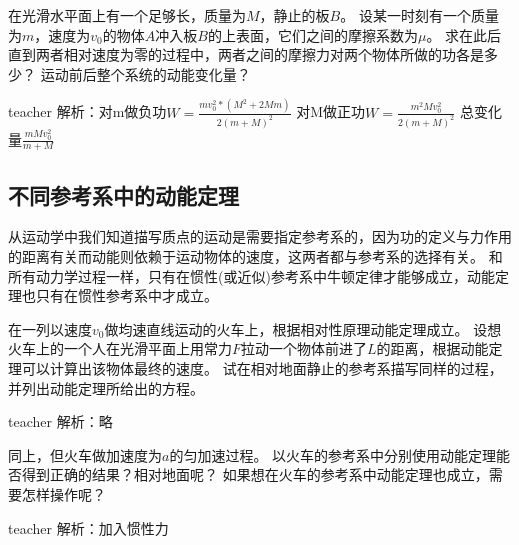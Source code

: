 \begin{example}
在光滑水平面上有一个足够长，质量为$M$，静止的板$B$。
设某一时刻有一个质量为$m$，速度为$v_0$的物体$A$冲入板$B$的上表面，它们之间的摩擦系数为$\mu$。
求在此后直到两者相对速度为零的过程中，两者之间的摩擦力对两个物体所做的功各是多少？
运动前后整个系统的动能变化量？
\begin{taggedblock}{teacher}
\newline
解析：对m做负功$W=\frac{mv_0^2*(M^2+2Mm)}{2(m+M)^2}$
\newline
对M做正功$W=\frac{m^2Mv_0^2}{2(m+M)^2}$
\newline
总变化量$\frac{mMv_0^2}{m+M}$
\end{taggedblock}
\end{example}

\subsection{不同参考系中的动能定理}
从运动学中我们知道描写质点的运动是需要指定参考系的，因为功的定义与力作用的距离有关而动能则依赖于运动物体的速度，这两者都与参考系的选择有关。
和所有动力学过程一样，只有在惯性(或近似)参考系中牛顿定律才能够成立，动能定理也只有在惯性参考系中才成立。

\begin{example}
在一列以速度$v_0$做均速直线运动的火车上，根据相对性原理动能定理成立。
设想火车上的一个人在光滑平面上用常力$F$拉动一个物体前进了$L$的距离，根据动能定理可以计算出该物体最终的速度。
试在相对地面静止的参考系描写同样的过程，并列出动能定理所给出的方程。
\begin{taggedblock}{teacher}
\newline
解析：略
\end{taggedblock}
\end{example}

\begin{example}
同上，但火车做加速度为$a$的匀加速过程。
以火车的参考系中分别使用动能定理能否得到正确的结果？相对地面呢？
如果想在火车的参考系中动能定理也成立，需要怎样操作呢？
\begin{taggedblock}{teacher}
\newline
解析：加入惯性力
\end{taggedblock}
\end{example}



